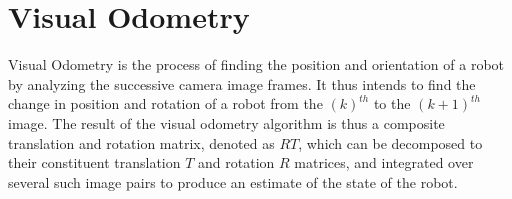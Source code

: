 \section{Visual Odometry}

Visual Odometry is the process of finding the position and orientation of a robot by analyzing the successive camera image frames. It thus intends to find the change in position and rotation of a robot from the \((k)^{th}\) to the \((k+1)^{th}\) image. The result of the visual odometry algorithm is thus a composite translation and rotation matrix, denoted as \(RT\), which can be decomposed to their constituent translation \(T\) and rotation \(R\) matrices, and integrated over several such image pairs to produce an estimate of the state of the robot.
